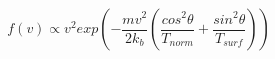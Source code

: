 \documentclass[12pt]{article}
\begin{document}
$$
	f(v) \propto v^2 exp\left(-\frac{mv^2}{2k_{b}}\left(\frac{cos^2\theta}{T_{norm}} + \frac{sin^2\theta}{T_{surf}}\right)\right) 
$$
\end{document}
